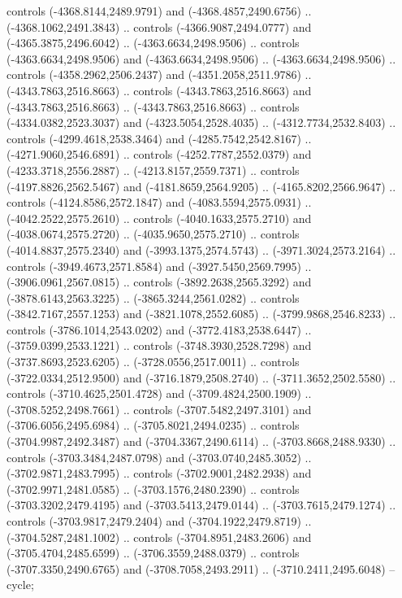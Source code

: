 \begin{scope}[shift={(430.80877,-416.69739)}]
\begin{scope}[shift={(4537.8125,-1856.4436)}]
\begin{scope}[shift={(-148.39113,-28.14259)}]
        controls (-4368.8144,2489.9791) and (-4368.4857,2490.6756) ..
        (-4368.1062,2491.3843) .. controls (-4366.9087,2494.0777) and
        (-4365.3875,2496.6042) .. (-4363.6634,2498.9506) .. controls
        (-4363.6634,2498.9506) and (-4363.6634,2498.9506) .. (-4363.6634,2498.9506) ..
        controls (-4358.2962,2506.2437) and (-4351.2058,2511.9786) ..
        (-4343.7863,2516.8663) .. controls (-4343.7863,2516.8663) and
        (-4343.7863,2516.8663) .. (-4343.7863,2516.8663) .. controls
        (-4334.0382,2523.3037) and (-4323.5054,2528.4035) .. (-4312.7734,2532.8403) ..
        controls (-4299.4618,2538.3464) and (-4285.7542,2542.8167) ..
        (-4271.9060,2546.6891) .. controls (-4252.7787,2552.0379) and
        (-4233.3718,2556.2887) .. (-4213.8157,2559.7371) .. controls
        (-4197.8826,2562.5467) and (-4181.8659,2564.9205) .. (-4165.8202,2566.9647) ..
        controls (-4124.8586,2572.1847) and (-4083.5594,2575.0931) ..
        (-4042.2522,2575.2610) .. controls (-4040.1633,2575.2710) and
        (-4038.0674,2575.2720) .. (-4035.9650,2575.2710) .. controls
        (-4014.8837,2575.2340) and (-3993.1375,2574.5743) .. (-3971.3024,2573.2164) ..
        controls (-3949.4673,2571.8584) and (-3927.5450,2569.7995) ..
        (-3906.0961,2567.0815) .. controls (-3892.2638,2565.3292) and
        (-3878.6143,2563.3225) .. (-3865.3244,2561.0282) .. controls
        (-3842.7167,2557.1253) and (-3821.1078,2552.6085) .. (-3799.9868,2546.8233) ..
        controls (-3786.1014,2543.0202) and (-3772.4183,2538.6447) ..
        (-3759.0399,2533.1221) .. controls (-3748.3930,2528.7298) and
        (-3737.8693,2523.6205) .. (-3728.0556,2517.0011) .. controls
        (-3722.0334,2512.9500) and (-3716.1879,2508.2740) .. (-3711.3652,2502.5580) ..
        controls (-3710.4625,2501.4728) and (-3709.4824,2500.1909) ..
        (-3708.5252,2498.7661) .. controls (-3707.5482,2497.3101) and
        (-3706.6056,2495.6984) .. (-3705.8021,2494.0235) .. controls
        (-3704.9987,2492.3487) and (-3704.3367,2490.6114) .. (-3703.8668,2488.9330) ..
        controls (-3703.3484,2487.0798) and (-3703.0740,2485.3052) ..
        (-3702.9871,2483.7995) .. controls (-3702.9001,2482.2938) and
        (-3702.9971,2481.0585) .. (-3703.1576,2480.2390) .. controls
        (-3703.3202,2479.4195) and (-3703.5413,2479.0144) .. (-3703.7615,2479.1274) ..
        controls (-3703.9817,2479.2404) and (-3704.1922,2479.8719) ..
        (-3704.5287,2481.1002) .. controls (-3704.8951,2483.2606) and
        (-3705.4704,2485.6599) .. (-3706.3559,2488.0379) .. controls
        (-3707.3350,2490.6765) and (-3708.7058,2493.2911) .. (-3710.2411,2495.6048) --
        cycle;


\end{scope}
\end{scope}
\end{scope}
